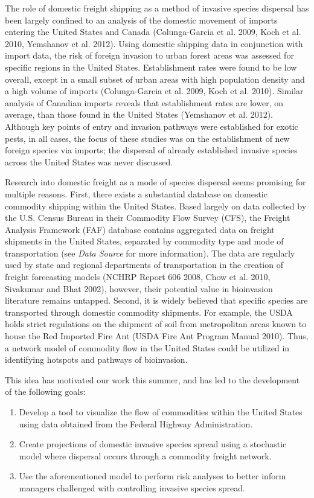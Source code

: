 \documentclass[12pt]{article}
\begin{document}
The role of domestic freight shipping as a method of invasive species dispersal has been largely confined to an analysis of the domestic movement of imports entering the United States and Canada (Colunga-Garcia et al. 2009, Koch et al. 2010, Yemshanov et al. 2012).  Using domestic shipping data in conjunction with import data, the risk of foreign invasion to urban forest areas was assessed for specific regions in the United States.  Establishment rates were found to be low overall, except in a small subset of urban areas with high population density and a high volume of imports (Colunga-Garcia et al. 2009, Koch et al. 2010).  Similar analysis of Canadian imports reveals that establishment rates are lower, on average, than those found in the United States (Yemshanov et al. 2012).  Although key points of entry and invasion pathways were established for exotic pests, in all cases, the focus of these studies was on the establishment of new foreign species via imports; the dispersal of already established invasive species across the United States was never discussed.  

Research into domestic freight as a mode of species dispersal seems promising for multiple reasons.  First, there exists a substantial database on domestic commodity shipping within the United States.  Based largely on data collected by the U.S. Census Bureau in their Commodity Flow Survey (CFS), the Freight Analysis Framework (FAF) database contains aggregated data on freight shipments in the United States, separated by commodity type and mode of transportation (see \textit{Data Source} for more information).  The data are regularly used by state and regional departments of transportation in the creation of freight forecasting models (NCHRP Report 606 2008, Chow et al. 2010, Sivakumar and Bhat 2002), however, their potential value in bioinvasion literature remains untapped.  Second, it is widely believed that specific species are transported through domestic commodity shipments. For example, the USDA holds strict regulations on the shipment of soil from metropolitan areas known to house the Red Imported Fire Ant (USDA Fire Ant Program Manual 2010).  Thus, a network model of commodity flow in the United States could be utilized in identifying hotspots and pathways of bioinvasion. 

This idea has motivated our work this summer, and has led to the development of the following goals:

\begin{enumerate}

\item Develop a tool to visualize the flow of commodities within the United States using data obtained from the Federal Highway Administration.

\item Create projections of domestic invasive species spread using a stochastic model where dispersal occurs through a commodity freight network.

\item Use the aforementioned model to perform risk analyses to better inform managers challenged with controlling invasive species spread.

\end{enumerate}
\end{document}

